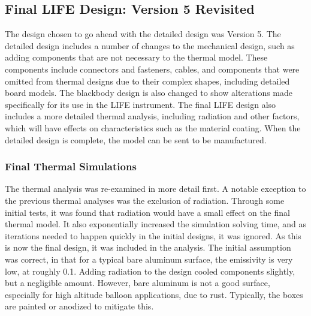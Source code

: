\subsection{Final LIFE Design: Version 5 Revisited}
The design chosen to go ahead with the detailed design was Version 5. The detailed design includes a number of changes to the mechanical design, such as adding components that are not necessary to the thermal model. These components include connectors and fasteners, cables, and components that were omitted from thermal designs due to their complex shapes, including detailed board models. The blackbody design is also changed to show alterations made specifically for its use in the LIFE instrument. The final LIFE design also includes a more detailed thermal analysis, including radiation and other factors, which will have effects on characteristics such as the material coating. When the detailed design is complete, the model can be sent to be manufactured.

\subsubsection{Final Thermal Simulations}

The thermal analysis was re-examined in more detail first. A notable exception to the previous thermal analyses was the exclusion of radiation. Through some initial tests, it was found that radiation would have a small effect on the final thermal model. It also exponentially increased the simulation solving time, and as iterations needed to happen quickly in the initial designs, it was ignored. As this is now the final design, it was included in the analysis. The initial assumption was correct, in that for a typical bare aluminum surface, the emissivity is very low, at roughly 0.1. Adding radiation to the design cooled components slightly, but a negligible amount. However, bare aluminum is not a good surface, especially for high altitude balloon applications, due to rust. Typically, the boxes are painted or anodized to mitigate this.

